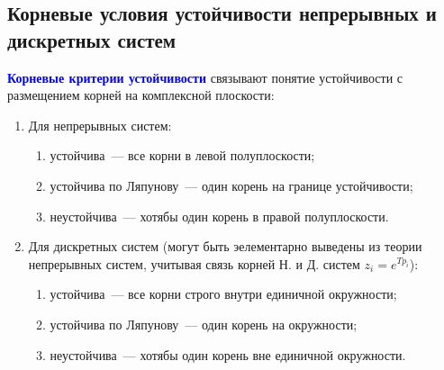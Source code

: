 \subsection{Корневые 	условия устойчивости непрерывных и 	дискретных систем}

\textcolor{blue}{\textbf{Корневые критерии устойчивости}} связывают понятие устойчивости с размещением корней на комплексной плоскости:
\begin{enumerate}
    \item Для непрерывных систем: 
    \begin{enumerate}
        \item устойчива~--- все корни в левой полуплоскости;
        \item устойчива по Ляпунову~--- один корень на границе устойчивости;
        \item неустойчива~--- хотябы один корень в правой полуплоскости.
    \end{enumerate}
    
    \item Для дискретных систем (могут быть эелементарно выведены из теории непрерывных систем, учитывая связь корней Н. и Д. систем $z_i = e^{T p_i}$):
    \begin{enumerate}
        \item устойчива~--- все корни строго внутри единичной окружности;
        \item устойчива по Ляпунову~--- один корень на окружности;
        \item неустойчива~--- хотябы один корень вне единичной окружности.
    \end{enumerate}
\end{enumerate}

